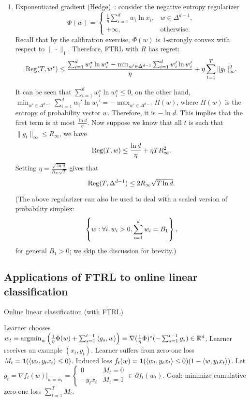 \documentclass{article}
\DeclareMathOperator*{\Reg}{{\rm Reg}}
\DeclareMathOperator*{\argmin}{{\rm argmin}}
\newcommand{\RR}{\mathbb{R}} %
\newcommand*{\one}{{\bf 1}}
\newcommand{\inner}[2]{\left\langle #1,#2 \right\rangle}
\begin{document}
\begin{enumerate}
  \item Exponentiated gradient (Hedge)~\cite{freund1997decision, kivinen1997exponentiated}: consider the negative entropy regularizer
  \[ \Phi(w) = \begin{cases} \frac{1}{\eta} \sum_{i=1}^d w_i \ln x_i, & w \in \Delta^{d-1}, \\ +\infty, & \text{otherwise}. \end{cases} \]
  Recall that by the calibration exercise, $\Phi(w)$ is $1$-strongly convex with respect to $\| \cdot \|_1$. Therefore, FTRL with $R$ has regret:
  \[ \Reg(T, w^\star) \leq \frac{\sum_{i=1}^d w_i^\star \ln w_i^\star - \min_{w' \in \Delta^{d-1}}\sum_{i=1}^d w_i' \ln w_i'}{\eta} + \eta \sum_{t=1}^T \| g_t \|_\infty^2. \]

  It can be seen that $\sum_{i=1}^d w_i^\star \ln w_i^\star \leq 0$, on the other hand, $\min_{w' \in \Delta^{d-1}} \sum_{i=1}^d w_i' \ln w_i' = - \max_{w' \in \Delta^{d-1}} H(w)$,
  where $H(w)$ is the entropy of probability vector $w$. Therefore, it is $-\ln d$. This implies that the first term is at most $\frac{\ln d}{\eta}$. Now suppose we know that all $t$ is such that $\| g_t \|_\infty \leq R_\infty$, we have
  \[ \Reg(T, w) \leq \frac{\ln d}{\eta} + \eta T R_\infty^2. \]
  Setting $\eta = \frac{\sqrt{\ln d}}{R_\infty \sqrt{T}}$ gives that
  \[ \Reg(T, \Delta^{d-1}) \leq 2 R_\infty \sqrt{T \ln d}. \]

  (The above regularizer can also be used to deal with a scaled version of probability simplex:
  \[ \cbr{w: \forall i, w_i > 0, \sum_{i=1}^d w_i = B_1}, \]
  for general $B_1 > 0$; we skip the discussion for brevity.)


\end{enumerate}

\subsection{Applications of FTRL to online linear classification}
\begin{algorithm}
\caption{Online linear classification (with FTRL)}
\begin{algorithmic}
\STATE Learner chooses $w_t = \argmin_{w} \del{ \frac{1}{\eta}\Phi(w) + \sum_{s=1}^{t-1} \inner{g_s}{w}} =  \nabla (\frac{1}{\eta} \Phi)^\star(-\sum_{s=1}^{t-1} g_s) \in \RR^d$,
\STATE Learner receives an example $(x_t, y_t)$.
\STATE Learner suffers from zero-one loss $M_t = \one(\inner{w_t}{y_t x_t} \leq 0)$.
\STATE Induced loss $f_t(w) = \one(\inner{w_t}{y_t x_t} \leq 0)(1 - \inner{w}{y_t x_t})$.
\STATE Let $g_t = \nabla f_t(w) |_{w = w_t} = \begin{cases} 0 & M_t = 0 \\ -y_t x_t & M_t = 1 \end{cases} \in \partial f_t(w_t)$.
\ENDFOR
\STATE Goal: minimize cumulative zero-one loss $\sum_{t=1}^T M_t$.
\end{algorithmic}
\end{algorithm}
\end{document}
